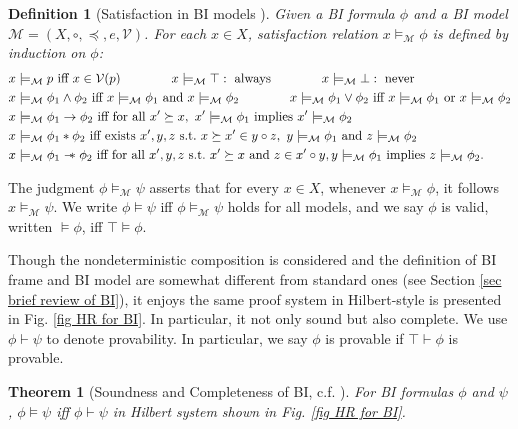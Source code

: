 \documentclass[conference,compsoc, 10pt]{IEEEtran}
\newtheorem{theorem}{Theorem}[section]
\newtheorem{definition}{Definition}[section]
\newcommand {\cM } {{\mathcal{M}}}
\newcommand {\cV } {{\mathcal{V}}}
\newcommand {\sepimp} {\mathrel{-\mkern-6mu*}}
\begin{document}
\begin{appendices}
		\begin{definition}[Satisfaction in BI models \cite{OP99,Doc19}]
			\label{def satisfaction BI nondeterministic}
			Given a BI formula $\phi$ and a BI model $\cM = (X,\circ,\preceq,e,\cV)$. For each $x\in X$, satisfaction relation $x\models_\cM \phi$ is defined by induction on $\phi$:
			\begin{align*}
			&  x\models_\cM p \ \text{iff}\ x\in\cV(p)\qquad\qquad
			x\models_\cM \top :\  \text{always} \qquad\qquad
			x\models_\cM \bot :\  \text{never} \\
			&  x\models_\cM \phi_1\wedge\phi_2 \  \text{iff}\ x\models_\cM\phi_1\ \text{and}\ x\models_\cM\phi_2 \qquad\qquad
			x\models_\cM \phi_1\vee\phi_2   \  \text{iff}\ x\models_\cM\phi_1\ \text{or}\ x\models_\cM\phi_2\\
			&  x\models_\cM \phi_1\rightarrow\phi_2  \  \text{iff\ for\ all}\ x^\prime\succeq x,\ x^\prime\models_\cM\phi_1\ \text{implies}\ x^\prime\models_\cM\phi_2\\
			&  x\models_\cM \phi_1\ast\phi_2  \  \text{iff\ exists}\ x^\prime,y,z\ \text{s.t.}\ x\succeq x^\prime\in y\circ z,\ y\models_\cM \phi_1\ \text{and}\ z\models_\cM\phi_2 \\
			&  x\models_\cM \phi_1\sepimp\phi_2  \  \text{iff\ for\ all}\ x^\prime,y,z\ \text{s.t.}\ x^\prime\succeq x\ \text{and}\ z\in x^\prime\circ y, y\models_\cM \phi_1\ \text{implies}\ z\models_\cM \phi_2. 
			\end{align*}		
		\end{definition}
		
		The judgment $\phi\models_\cM\psi$ asserts that for every $x\in X$, whenever $x\models_\cM \phi$, it follows $x\models_\cM \psi$. We write $\phi\models\psi$ iff $\phi\models_\cM\psi$ holds for all models, and we say $\phi$ is valid, written $\models \phi$, iff $\top\models\phi$.
		
		Though the nondeterministic composition is considered and the definition of BI frame and BI model are somewhat different from standard ones (see Section \ref{sec brief review of BI}), it enjoys the same proof system in Hilbert-style is presented in Fig. \ref{fig HR for BI}. In particular, it not only sound but also complete. 
		We use $\phi\vdash\psi$ to denote provability. In particular, we say $\phi$ is provable if $\top\vdash\phi$ is provable.
		
		\begin{theorem}[Soundness and Completeness of BI, c.f. \cite{OP99,Doc19}]
			\label{thm sound complete BI}
			For BI formulas $\phi$ and $\psi$, $\phi\models\psi$ iff $\phi\vdash\psi$ in Hilbert system shown in Fig. \ref{fig HR for BI}.
		\end{theorem}
		

\end{appendices}
\end{document}
